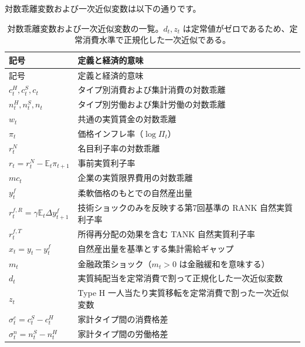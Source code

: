 \documentclass[
  japanese,
  lualatex,
  ja=standard,
  12pt,
  a4paper]{ltjsarticle}
\begin{document}
対数乖離変数および一次近似変数は以下の通りです。

\begin{longtable}[]{@{}
  >{\raggedright\arraybackslash}p{}
  >{\raggedright\arraybackslash}p{}@{}}
\caption{対数乖離変数および一次近似変数の一覧。\(d_t, z_t\)
は定常値がゼロであるため、定常消費水準で正規化した一次近似である。}\tabularnewline
\toprule\noalign{}
\begin{minipage}[b]{\linewidth}\raggedright
記号
\end{minipage} & \begin{minipage}[b]{\linewidth}\raggedright
定義と経済的意味
\end{minipage} \\
\midrule\noalign{}
\endfirsthead
\toprule\noalign{}
\begin{minipage}[b]{\linewidth}\raggedright
記号
\end{minipage} & \begin{minipage}[b]{\linewidth}\raggedright
定義と経済的意味
\end{minipage} \\
\midrule\noalign{}
\endhead
\bottomrule\noalign{}
\endlastfoot
\(c_t^H, c_t^S, c_t\) & タイプ別消費および集計消費の対数乖離 \\
\(n_t^H, n_t^S, n_t\) & タイプ別労働および集計労働の対数乖離 \\
\(w_t\) & 共通の実質賃金の対数乖離 \\
\(\pi_t\) & 価格インフレ率（\(\log \Pi_t\)） \\
\(r_t^N\) & 名目利子率の対数乖離 \\
\(r_t = r_t^N - \mathbb{E}_t \pi_{t+1}\) & 事前実質利子率 \\
\(mc_t\) & 企業の実質限界費用の対数乖離 \\
\(y_t^f\) & 柔軟価格のもとでの自然産出量 \\
\(r_t^{f,R} = \gamma \mathbb{E}_t \Delta y_{t+1}^f\) &
技術ショックのみを反映する第7回基準の RANK 自然実質利子率 \\
\(r_t^{f,T}\) & 所得再分配の効果を含む TANK 自然実質利子率 \\
\(x_t = y_t - y_t^f\) & 自然産出量を基準とする集計需給ギャップ \\
\(m_t\) & 金融政策ショック（\(m_t>0\) は金融緩和を意味する） \\
\(d_t\) & 実質純配当を定常消費で割って正規化した一次近似変数 \\
\(z_t\) & Type H 一人当たり実質移転を定常消費で割った一次近似変数 \\
\(\sigma_t^c = c_t^S - c_t^H\) & 家計タイプ間の消費格差 \\
\(\sigma_t^n = n_t^S - n_t^H\) & 家計タイプ間の労働格差 \\
\end{longtable}
\end{document}
